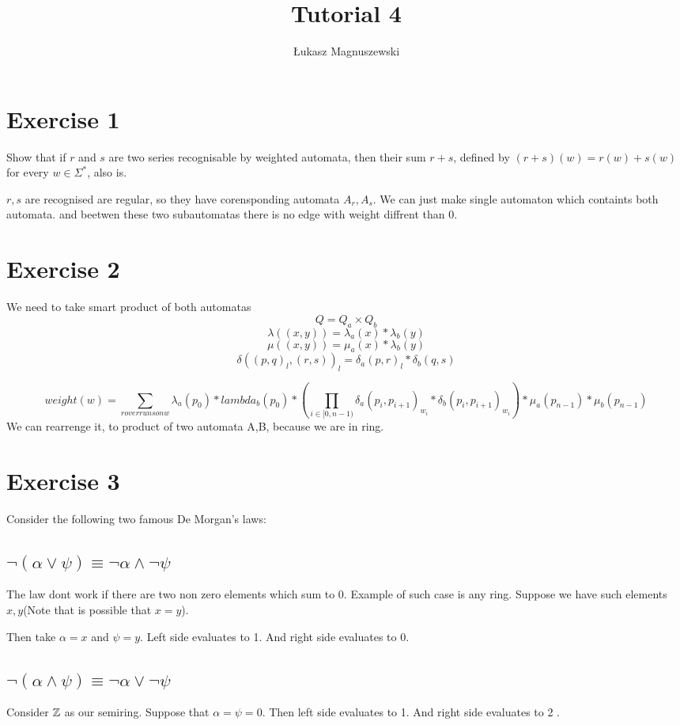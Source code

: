 \documentclass{article}
\author{Łukasz Magnuszewski}
\title{Tutorial 4}
\begin{document}
\maketitle


\section{Exercise 1}
Show that if $r$ and $s$ are two series recognisable by weighted automata, then their sum $r +s$, defined by $(r+s)(w) = r(w) + s(w)$ for every $w \in \Sigma^*$, also is.

$r,s$ are recognised are regular, so they have corensponding automata $A_r, A_s$. We can just make single automaton which containts both automata. and beetwen these two subautomatas there is no edge with weight diffrent than 0.


\section{Exercise 2}
We need to take smart product of both automatas
\[ Q = Q_a \times Q_b\] 
\[ \lambda ((x,y))  = \lambda_a(x) * \lambda_b(y) \]
\[ \mu ((x,y))  = \mu_a(x) * \lambda_b(y) \]
\[  \delta((p,q)_l, (r, s))_l = \delta_a(p,r)_l * \delta_b(q,s)  \]

\[
  weight(w) =  \sum_{r over runs on w} \lambda_a(p_0) * lambda_b(p_0) * (\prod_{i \in [0,n-1)}  \delta_a(p_i, p_{i+1})_{w_i}
  * \delta_b(p_i, p_{i+1})_{w_i} ) *  \mu_a(p_{n-1}) * \mu_b(p_{n-1})
\]
We can rearrenge it, to product of two automata A,B, because we are in ring.

\section{Exercise 3}
Consider the following two famous De Morgan's laws:
\subsection{$\neg(\alpha \lor \psi) \equiv \neg \alpha \land \neg \psi$}

The law dont work if there are two non zero elements which sum to 0. Example of such case is any ring.
Suppose we have such elements $x,y$(Note that is possible that $x=y$).

Then take $\alpha = x$ and $\psi = y$. Left side evaluates to 1. And right side evaluates to 0\coffee.


\subsection{$\neg(\alpha \land \psi) \equiv \neg \alpha \lor \neg \psi$}
Consider $\mathbb{Z}$ as our semiring.
Suppose that $\alpha = \psi = 0 $. Then left side evaluates to 1. And right side evaluates to 2 \coffee.   
\end{document}
